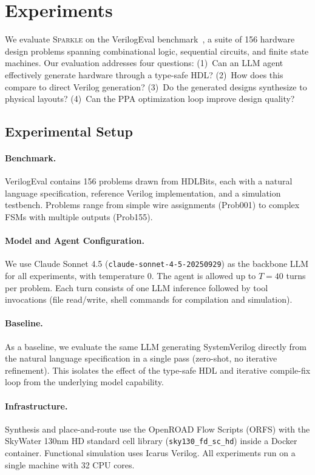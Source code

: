 \section{Experiments}
\label{sec:experiments}

We evaluate \textsc{Sparkle} on the VerilogEval benchmark~\citep{liu2023verilogeval}, a suite of 156 hardware design problems spanning combinational logic, sequential circuits, and finite state machines. Our evaluation addresses four questions: (1)~Can an LLM agent effectively generate hardware through a type-safe HDL? (2)~How does this compare to direct Verilog generation? (3)~Do the generated designs synthesize to physical layouts? (4)~Can the PPA optimization loop improve design quality?

\subsection{Experimental Setup}
\label{sec:setup}

\paragraph{Benchmark.}
VerilogEval contains 156 problems drawn from HDLBits, each with a natural language specification, reference Verilog implementation, and a simulation testbench. Problems range from simple wire assignments (Prob001) to complex FSMs with multiple outputs (Prob155).

\paragraph{Model and Agent Configuration.}
We use Claude Sonnet 4.5 (\texttt{claude-sonnet-4-5-20250929}) as the backbone LLM for all experiments, with temperature 0. The agent is allowed up to $T{=}40$ turns per problem. Each turn consists of one LLM inference followed by tool invocations (file read/write, shell commands for compilation and simulation).

\paragraph{Baseline.}
As a baseline, we evaluate the same LLM generating SystemVerilog directly from the natural language specification in a single pass (zero-shot, no iterative refinement). This isolates the effect of the type-safe HDL and iterative compile-fix loop from the underlying model capability.

\paragraph{Infrastructure.}
Synthesis and place-and-route use the OpenROAD Flow Scripts (ORFS) with the SkyWater 130nm HD standard cell library (\texttt{sky130\_fd\_sc\_hd}) inside a Docker container. Functional simulation uses Icarus Verilog. All experiments run on a single machine with 32 CPU cores.

